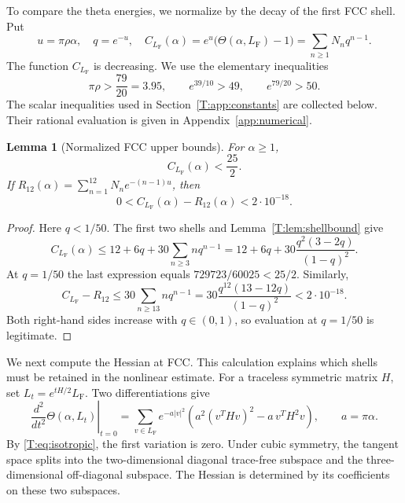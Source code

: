 \documentclass[reqno,english]{amsart}
\newtheorem{lemma}[theorem]{Lemma}
\theoremstyle{definition}
\newtheorem{open problem}[theorem]{Open Problem}
\theoremstyle{remark}
\theoremstyle{plain}
\numberwithin{equation}{section}
\newcommand{\FCC}{L_{\mathrm F}}
\newcommand{\Th}{\Theta}
\begin{document}
To compare the theta energies, we normalize by the decay of the first
FCC shell. Put
\begin{equation}\label{T:eq:uCF}
 u=\pi\rho\alpha,\quad q=e^{-u},\quad
 C_{\FCC}(\alpha)=e^u\bigl(\Th(\alpha,\FCC)-1\bigr)
 =\sum_{n\ge1}N_n q^{n-1}.
\end{equation}
The function $C_{\FCC}$ is decreasing. We use the elementary inequalities
\begin{equation}\label{T:eq:basicnumbers}
 \pi\rho>\frac{79}{20}=3.95,
 \qquad e^{39/10}>49,
 \qquad e^{79/20}>50.
\end{equation}
The scalar inequalities used in Section~\ref{T:app:constants} are
collected below. Their rational evaluation is given in
Appendix~\ref{app:numerical}.

\begin{lemma}[Normalized FCC upper bounds]\label{T:lem:CFbounds}
For $\alpha\ge1$,
\begin{equation}\label{T:eq:CF125}
 C_{\FCC}(\alpha)<\frac{25}{2}.
\end{equation}
If $R_{12}(\alpha)=\sum_{n=1}^{12}N_n e^{-(n-1)u}$, then
\begin{equation}\label{T:eq:reftail}
 0<C_{\FCC}(\alpha)-R_{12}(\alpha)<2\cdot10^{-18}.
\end{equation}
\end{lemma}
\begin{proof}
Here $q<1/50$. The first two shells and Lemma~\ref{T:lem:shellbound} give
\[
 C_{\FCC}(\alpha)
 \le12+6q+30\sum_{n\ge3}nq^{n-1}
 =12+6q+30\frac{q^2(3-2q)}{(1-q)^2}.
\]
At $q=1/50$ the last expression equals $729723/60025<25/2$. Similarly,
\[
 C_{\FCC}-R_{12}
 \le30\sum_{n\ge13}nq^{n-1}
 =30\frac{q^{12}(13-12q)}{(1-q)^2}<2\cdot10^{-18}.
\]
Both right-hand sides increase with $q\in(0,1)$, so evaluation at $q=1/50$ is legitimate.
\end{proof}


We next compute the Hessian at FCC. This calculation explains which
shells must be retained in the nonlinear estimate. For a traceless
symmetric matrix $H$, set $L_t=e^{tH/2}\FCC$. Two differentiations
give
\begin{equation}\label{T:eq:hessian}
 \left.\frac{d^2}{dt^2}\Th(\alpha,L_t)\right|_{t=0}
 =\sum_{v\in\FCC}e^{-a|v|^2}
 \left(a^2(v^THv)^2-a\,v^TH^2v\right),\qquad a=\pi\alpha.
\end{equation}
By \eqref{T:eq:isotropic}, the first variation is zero. Under cubic
symmetry, the tangent space splits into the two-dimensional diagonal
trace-free subspace and the three-dimensional off-diagonal subspace.
The Hessian is determined by its coefficients on these two subspaces.
\end{document}
